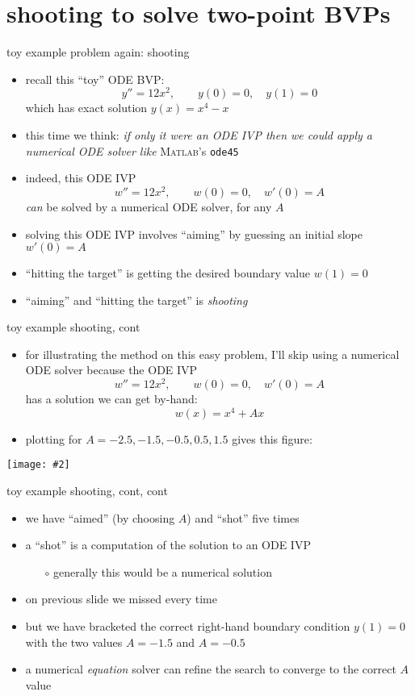 \documentclass[10pt,hyperref]{beamer}
\newcommand{\Matlab}{\textsc{Matlab}\xspace}
\newcommand{\centerimage}[2]{\begin{center}
\texttt{[image: \#2]}
\end{center}}
\begin{document}
\section[shooting]{shooting to solve two-point BVPs}

\begin{frame}{toy example problem again: shooting} 

\begin{itemize}
\item recall this ``toy'' ODE BVP:
    $$y'' = 12 x^2, \qquad y(0)=0, \quad y(1) = 0$$
which has exact solution $y(x)=x^4-x$
\item this time we think: \emph{if only it were an ODE IVP then we could apply a numerical ODE solver like} \Matlab's \texttt{ode45}
\item indeed, this ODE IVP
    $$w'' = 12 x^2, \qquad w(0)=0, \quad w'(0) = A$$
\emph{can} be solved by a numerical ODE solver, for any $A$
\item solving this ODE IVP involves \alert{``aiming''} by guessing an initial slope $w'(0)=A$
\item \alert{``hitting the target''} is getting the desired boundary value $w(1)=0$
\item ``aiming'' and ``hitting the target'' is \emph{shooting}
\end{itemize}
\end{frame}


\begin{frame}{toy example shooting, cont} 

\begin{itemize}
\item for illustrating the method on this easy problem, I'll skip using a numerical ODE solver because the ODE IVP
    $$w'' = 12 x^2, \qquad w(0)=0, \quad w'(0)=A$$
has a solution we can get by-hand:
    $$w(x) = x^4 + A x$$
\item plotting for $A=-2.5,-1.5,-0.5,0.5,1.5$ gives this figure:
\end{itemize}

\centerimage{0.65}{toyshoot-crop90}
\end{frame}


\begin{frame}{toy example shooting, cont, cont} 

\begin{itemize}
\item we have ``aimed'' (by choosing $A$) and ``shot'' five times
\item a ``shot'' is a computation of the solution to an ODE IVP
  \begin{itemize}
  \item[$\circ$] generally this would be a numerical solution
  \end{itemize}
\item on previous slide we missed every time
\item but we have bracketed the correct right-hand boundary condition $y(1)=0$ with the two values $A=-1.5$ and $A=-0.5$
\item a numerical \emph{equation} solver can refine the search to converge to the correct $A$ value
\end{itemize}
\end{frame}
\end{document}
